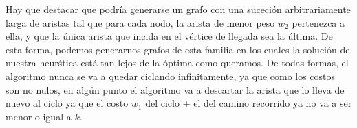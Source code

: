 \vspace{2mm}

Hay que destacar que podr\'ia generarse un grafo con una suceci\'on arbitrariamente larga de aristas tal que para cada nodo, la arista de menor peso $w_2$ pertenezca a ella, y que la \'unica arista que incida en el v\'ertice de llegada sea la \'ultima. De esta forma, podemos generarnos grafos de esta familia en los cuales la soluci\'on de nuestra heur\'stica est\'a tan lejos de la \'optima como queramos. De todas formas, el algoritmo nunca se va a quedar ciclando infinitamente, ya que como los costos son no nulos, en alg\'un punto el algoritmo va a descartar la arista que lo lleva de nuevo al ciclo ya que el costo $w_1$ del ciclo + el del camino recorrido ya no va a ser menor o igual a $k$.